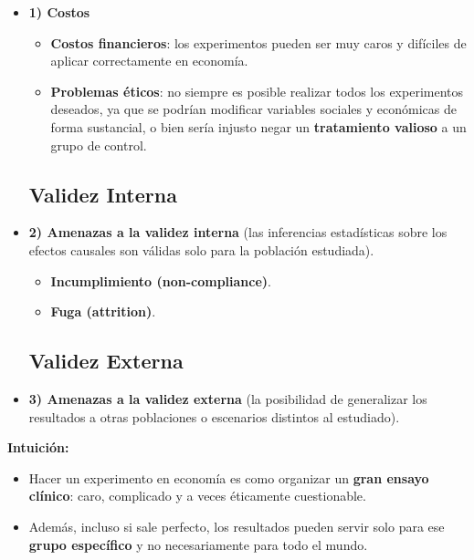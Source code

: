 \documentclass[12pt]{article}
\begin{document}
\begin{itemize}
    \item \textbf{1) Costos}
    \begin{itemize}
        \item \textbf{Costos financieros}: los experimentos pueden ser muy caros y difíciles de aplicar correctamente en economía.
        \item \textbf{Problemas éticos}: no siempre es posible realizar todos los experimentos deseados, ya que se podrían modificar variables sociales y económicas de forma sustancial, o bien sería injusto negar un \textbf{tratamiento valioso} a un grupo de control.
    \end{itemize}

    \subsection*{\noindent\textbf{Validez Interna}}

    \item \textbf{2) Amenazas a la validez interna}  
    (las inferencias estadísticas sobre los efectos causales son válidas solo para la población estudiada).
    \begin{itemize}
        \item \textbf{Incumplimiento (non-compliance)}.
        \item \textbf{Fuga (attrition)}.
    \end{itemize}

\subsection*{\noindent\textbf{Validez Externa}}

    \item \textbf{3) Amenazas a la validez externa}  
    (la posibilidad de generalizar los resultados a otras poblaciones o escenarios distintos al estudiado).
\end{itemize}

\textbf{Intuición:}
\begin{itemize}
    \item Hacer un experimento en economía es como organizar un \textbf{gran ensayo clínico}: caro, complicado y a veces éticamente cuestionable.
    \item Además, incluso si sale perfecto, los resultados pueden servir solo para ese \textbf{grupo específico} y no necesariamente para todo el mundo.
\end{itemize}
\end{document}
